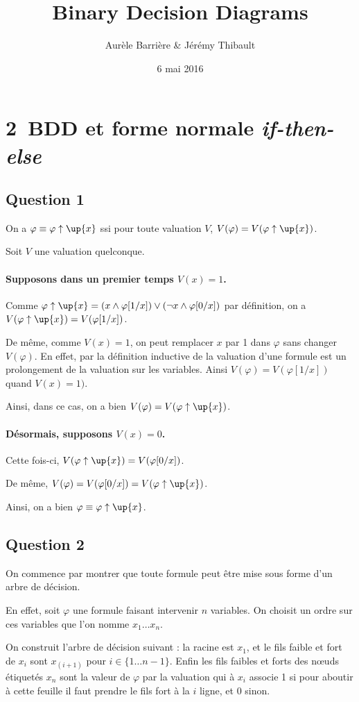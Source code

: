 \documentclass[12pt]{article}
\title{Binary Decision Diagrams}
\author{Aurèle Barrière \& Jérémy Thibault}
\date{6 mai 2016}
\def\question#1{\subsection*{Question #1}}
\def\phix{\varphi\uparrow\up{x}}
\def\ite{\textit{if-then-else}}
\begin{document}
\maketitle

\section*{2\ BDD et forme normale \ite}

\question{1}

On a $\varphi\equiv\phix$ ssi pour toute valuation $V$, $V(\varphi) = V(\phix)$.

Soit $V$ une valuation quelconque.

\paragraph{Supposons dans un premier temps $V(x) = 1$.} Comme $\phix = (x \wedge\varphi[1/x])\vee(\neg x\wedge\varphi[0/x])$ par définition, on a $V(\phix) = V(\varphi[1/x])$.

De même, comme $V(x) = 1$, on peut remplacer $x$ par 1 dans $\varphi$ sans changer $V(\varphi)$. En effet, par la définition inductive de la valuation d'une formule est un prolongement de la valuation sur les variables. Ainsi $V(\varphi)=V(\varphi[1/x])$ quand $V(x)=1)$.

Ainsi, dans ce cas, on a bien $V(\varphi) = V(\phix)$.

\paragraph{Désormais, supposons $V(x)=0$.} Cette fois-ci, $V(\phix) = V(\varphi[0/x])$.

De même, $V(\varphi) =  V(\varphi[0/x]) = V(\phix)$.

Ainsi, on a bien $\varphi\equiv\phix$.

\question{2}

On commence par montrer que toute formule peut être mise sous forme d'un arbre de décision.

En effet, soit $\varphi$ une formule faisant intervenir $n$ variables. On choisit un ordre sur ces variables que l'on nomme $x_1\dots x_n$.

On construit l'arbre de décision suivant : la racine est $x_1$, et le fils faible et fort de $x_i$ sont $x_{(i+1)}$ pour $i\in\{1\dots n-1\}$. Enfin les fils faibles et forts des n\oe uds étiquetés $x_n$ sont la valeur de $\varphi$ par la valuation qui à $x_i$ associe 1 si pour aboutir à cette feuille il faut prendre le fils fort à la $i$ ligne, et 0 sinon.
\end{document}
